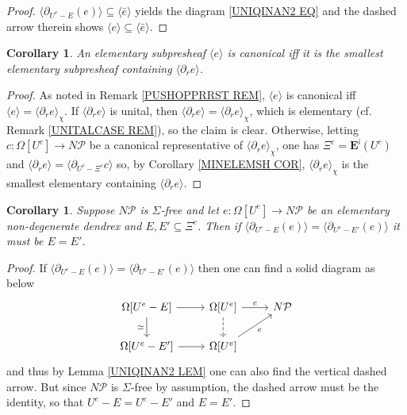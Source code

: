 \documentclass[a4paper,10pt
,draft
]{article}%
\numberwithin{equation}{section}
\numberwithin{figure}{section}
\newtheorem{corollary}[equation]{Corollary}%
\theoremstyle{definition} %
\newcommand{\1}{\ensuremath{\mathbbm 1}}%
\begin{document}
\begin{proof}
	$\langle \partial_{U^e - E} (e)\rangle
	\subseteq \langle \bar{e} \rangle$
	yields the diagram \eqref{UNIQINAN2 EQ}
	and the dashed arrow therein shows
	$\langle e\rangle
	\subseteq \langle \bar{e} \rangle$.
\end{proof}



\begin{corollary}\label{CANCHAR COR}
	An elementary subpresheaf $\langle e \rangle$
	is canonical iff
	it is the smallest elementary subpresheaf containing
	$\langle \partial_r e \rangle$.
\end{corollary}



\begin{proof}
	As noted in Remark \ref{PUSHOPPRRST REM}, 
	$\langle e \rangle$ is canonical iff
	$\langle e \rangle = \langle \partial_r e \rangle_{\chi}$.
	If $\langle \partial_r e \rangle$ is unital, then 
	$\langle \partial_r e \rangle = \langle \partial_r e \rangle_{\chi}$,
	which is elementary (cf. Remark \ref{UNITALCASE REM}), so the claim is clear.
	Otherwise, letting 
	$c \colon \Omega[U^c] \to N \mathcal{P}$
	be a canonical representative of
	$\langle \partial_r e \rangle_{\chi} $,
	one has
	$\Xi^c = \boldsymbol{E}^{\mathsf{i}}(U^c)$
	and
	$\langle \partial_r e \rangle = 
	\langle \partial_{U^c-\Xi^c} c \rangle$
	so, by Corollary \ref{MINELEMSH COR},
	$\langle \partial_r e \rangle_{\chi} $
	is the smallest elementary containing $\langle \partial_r e \rangle$.
\end{proof}



\begin{corollary}\label{ISODIFCL COR}
	Suppose $N \mathcal{P}$ is $\Sigma$-free
	and let $e \colon \Omega[U^e] \to N \mathcal{P}$
	be an elementary non-degenerate dendrex and
	$E,E' \subseteq \Xi^e$.
	Then if 
	$\langle \partial_{U^e-E} (e) \rangle
	=
	\langle \partial_{U^e-E'} (e) \rangle$
	it must be $E = E'$.
\end{corollary}



\begin{proof}
	If 
	$\langle \partial_{U^e-E} (e) \rangle
	=
	\langle \partial_{U^e-E'} (e) \rangle$
	then one can find a solid diagram as below
	\[
	\begin{tikzcd}
	\Omega[U^e-E] \ar{d}[swap]{\simeq} \ar{r} &
	\Omega[U^e] \ar{r}{e} \ar[dashed]{d} &
	N \mathcal{P}
	\\
	\Omega[U^e-E'] \ar{r} &
	\Omega[U^e] \ar{ru}[swap]{e} &
	\end{tikzcd}
	\]
	and thus by Lemma \ref{UNIQINAN2 LEM} one can also find the vertical dashed arrow.
	But since $N \mathcal{P}$ is $\Sigma$-free
	by assumption,
	the dashed arrow must be the identity,
	so that $U^e-E=U^e-E'$ and $E=E'$.
\end{proof}
\end{document}
